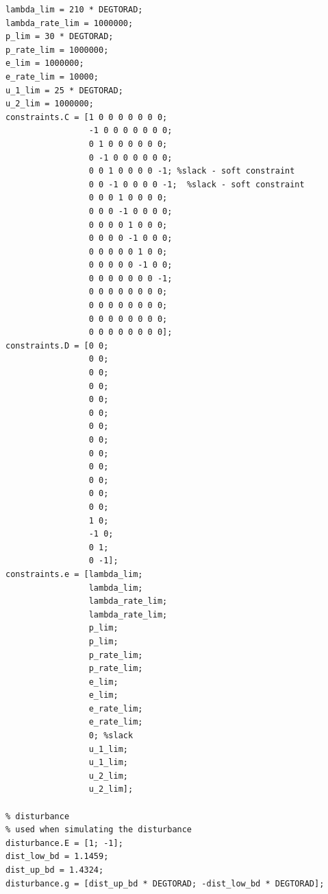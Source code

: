 \begin{lstlisting}[caption={data.m}]
%constraints
lambda_lim = 210 * DEGTORAD;
lambda_rate_lim = 1000000;
p_lim = 30 * DEGTORAD;
p_rate_lim = 1000000;
e_lim = 1000000;
e_rate_lim = 10000;
u_1_lim = 25 * DEGTORAD;
u_2_lim = 1000000;
constraints.C = [1 0 0 0 0 0 0 0; 
                 -1 0 0 0 0 0 0 0; 
                 0 1 0 0 0 0 0 0;  
                 0 -1 0 0 0 0 0 0;
                 0 0 1 0 0 0 0 -1; %slack - soft constraint
                 0 0 -1 0 0 0 0 -1;  %slack - soft constraint
                 0 0 0 1 0 0 0 0; 
                 0 0 0 -1 0 0 0 0;
                 0 0 0 0 1 0 0 0; 
                 0 0 0 0 -1 0 0 0; 
                 0 0 0 0 0 1 0 0; 
                 0 0 0 0 0 -1 0 0;
                 0 0 0 0 0 0 0 -1;
                 0 0 0 0 0 0 0 0; 
                 0 0 0 0 0 0 0 0;
                 0 0 0 0 0 0 0 0; 
                 0 0 0 0 0 0 0 0];
constraints.D = [0 0; 
                 0 0; 
                 0 0; 
                 0 0; 
                 0 0; 
                 0 0; 
                 0 0; 
                 0 0; 
                 0 0; 
                 0 0; 
                 0 0; 
                 0 0; 
                 0 0;
                 1 0; 
                 -1 0; 
                 0 1; 
                 0 -1];
constraints.e = [lambda_lim; 
                 lambda_lim; 
                 lambda_rate_lim; 
                 lambda_rate_lim;
                 p_lim; 
                 p_lim; 
                 p_rate_lim;
                 p_rate_lim;
                 e_lim; 
                 e_lim; 
                 e_rate_lim; 
                 e_rate_lim;  
                 0; %slack
                 u_1_lim; 
                 u_1_lim; 
                 u_2_lim;
                 u_2_lim];
             
% disturbance
% used when simulating the disturbance
disturbance.E = [1; -1];
dist_low_bd = 1.1459;
dist_up_bd = 1.4324;
disturbance.g = [dist_up_bd * DEGTORAD; -dist_low_bd * DEGTORAD];
\end{lstlisting}



